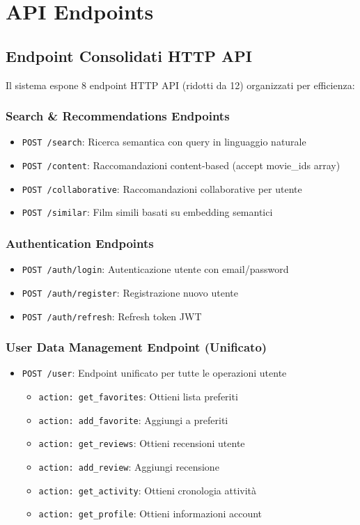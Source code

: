 \documentclass[11pt,a4paper]{article}
\begin{document}
\section{API Endpoints}

\subsection{Endpoint Consolidati HTTP API}
Il sistema espone 8 endpoint HTTP API (ridotti da 12) organizzati per efficienza:

\subsubsection{Search \& Recommendations Endpoints}
\begin{itemize}
  \item \texttt{POST /search}: Ricerca semantica con query in linguaggio naturale
  \item \texttt{POST /content}: Raccomandazioni content-based (accept movie\_ids array)
  \item \texttt{POST /collaborative}: Raccomandazioni collaborative per utente
  \item \texttt{POST /similar}: Film simili basati su embedding semantici
\end{itemize}

\subsubsection{Authentication Endpoints}
\begin{itemize}
  \item \texttt{POST /auth/login}: Autenticazione utente con email/password
  \item \texttt{POST /auth/register}: Registrazione nuovo utente
  \item \texttt{POST /auth/refresh}: Refresh token JWT
\end{itemize}

\subsubsection{User Data Management Endpoint (Unificato)}
\begin{itemize}
  \item \texttt{POST /user}: Endpoint unificato per tutte le operazioni utente
    \begin{itemize}
      \item \texttt{action: get\_favorites}: Ottieni lista preferiti
      \item \texttt{action: add\_favorite}: Aggiungi a preferiti
      \item \texttt{action: get\_reviews}: Ottieni recensioni utente
      \item \texttt{action: add\_review}: Aggiungi recensione
      \item \texttt{action: get\_activity}: Ottieni cronologia attività
      \item \texttt{action: get\_profile}: Ottieni informazioni account
    \end{itemize}
\end{itemize}
\end{document}
